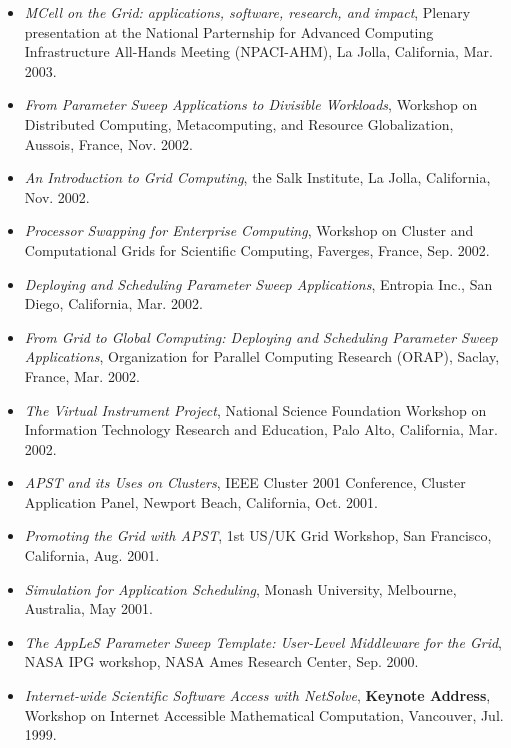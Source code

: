 \documentclass[times,11pt]{letter}
\begin{document}
\begin{itemize}
\item[-] {\it MCell on the Grid: applications, software, research,
and impact}, Plenary presentation at the National Parternship for Advanced
Computing Infrastructure All-Hands Meeting (NPACI-AHM), La Jolla,
California, Mar. 2003.


\item[-] {\it From Parameter Sweep Applications to Divisible Workloads},
Workshop on Distributed Computing, Metacomputing, and Resource
Globalization, Aussois, France, Nov. 2002.

\item[-] {\it An Introduction to Grid Computing}, the Salk Institute,
La Jolla, California, Nov. 2002.

\item[-] {\it Processor Swapping for Enterprise Computing}, Workshop
on Cluster and Computational Grids for Scientific Computing, Faverges,
France, Sep. 2002.

\item[-] {\it Deploying and Scheduling Parameter Sweep Applications},
Entropia Inc., San Diego, California, Mar. 2002.

\item[-] {\it From Grid to Global Computing: Deploying and Scheduling
Parameter Sweep Applications}, Organization for Parallel Computing
Research (ORAP), Saclay, France, Mar. 2002.

\item[-] {\it The Virtual Instrument Project}, National Science Foundation
Workshop on Information Technology Research and Education, Palo Alto,
California, Mar. 2002.

\item[-] {\it APST and its Uses on Clusters}, IEEE Cluster 2001
Conference, Cluster Application Panel, Newport Beach, California,
Oct. 2001.

\item[-] {\it Promoting the Grid with APST}, 1st US/UK Grid Workshop,
San Francisco, California, Aug. 2001.

\item[-] {\it Simulation for Application Scheduling}, Monash University,
Melbourne, Australia, May 2001.

\item[-] {\it The AppLeS Parameter Sweep Template: User-Level Middleware
for the Grid}, NASA IPG workshop, NASA Ames Research Center, Sep.
2000.

\item[-] {\it Internet-wide Scientific Software Access with NetSolve},
{\bf Keynote Address},
Workshop on Internet Accessible Mathematical Computation, Vancouver,
Jul. 1999.


\end{itemize}
\end{document}
